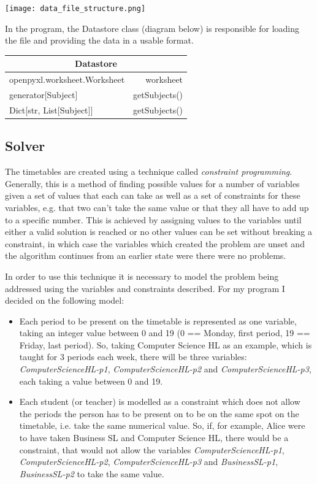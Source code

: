 \documentclass[12pt]{article}
\begin{document}
\texttt{[image: data\_file\_structure.png]}

In the program, the Datastore class (diagram below) is responsible for loading
the file and providing the data in a usable format.
%
\begin{table}[H]
    \centering
    \def\arraystretch{1.5}
    \begin{tabular}{|l r|}
        \hline
        \multicolumn{2}{|c|}{Datastore}\\
        \hline
        \hline
        openpyxl.worksheet.Worksheet &worksheet\\
        \hline
        generator[Subject] &getSubjects()\\
        Dict[str, List[Subject]] &getSubjects()\\
        \hline
    \end{tabular}
    \label{table:datastore}
\end{table}
%


\subsection{Solver}

The timetables are created using a technique called \emph{constraint programming}.
Generally, this is a method of finding possible values for a number of variables given a set
of values that each can take as well as a set of constraints for these variables, e.g. that
two can't take the same value or that they all have to add up to a specific number.  This is
achieved by assigning values to the variables until either a valid solution is reached or no
other values can be set without breaking a constraint, in which case the variables which
created the problem are unset and the algorithm continues from an earlier state were there
were no problems.

In order to use this technique it is necessary to model the problem being addressed using
the variables and constraints described. For my program I decided on the following model:
%
\begin{itemize}
    \item Each period to be present on the timetable is represented as one variable, taking
        an integer value between 0 and 19 (0 == Monday, first period, 19 == Friday, last
        period). So, taking Computer Science HL as an example, which is taught for 3 periods
        each week, there will be three variables: \textit{ComputerScienceHL-p1},
        \textit{ComputerScienceHL-p2} and \textit{ComputerScienceHL-p3}, each taking a value
        between 0 and 19.

    \item Each student (or teacher) is modelled as a constraint which does not allow the
        periods the person has to be present on to be on the same spot on the timetable,
        i.e. take the same numerical value. So, if, for example, Alice were to have taken
        Business SL and Computer Science HL, there would be a constraint, that would not
        allow the variables \textit{ComputerScienceHL-p1}, \textit{ComputerScienceHL-p2},
        \textit{ComputerScienceHL-p3} and \textit{BusinessSL-p1}, \textit{BusinessSL-p2} to
        take the same value.
\end{itemize}
%
\end{document}
